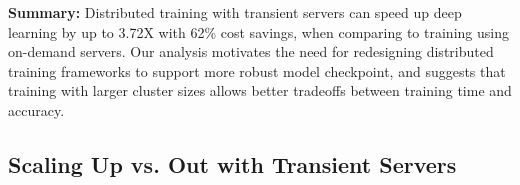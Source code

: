 \textbf{Summary:} Distributed training with transient servers can speed up
deep learning by up to 3.72X with 62\% cost savings, when comparing to training using on-demand servers. 
Our analysis motivates the need for redesigning distributed training frameworks to support more robust model checkpoint, 
and suggests that training with larger cluster sizes allows better tradeoffs between training time and accuracy. 


\subsection{Scaling Up vs. Out  with Transient Servers}
\label{subsec:scale_up}

\begin{table}[t]
\caption{\textbf{Scaling up vs. scaling out.} Under the same training cost budget constraint,  we empirically measure and compare the training performance of scaling up and out using transient resources. We calculate the average performance across all training setups that completed successfully. In the scale up case, 28 (12) out of 32 runs for \textit{P100} (\textit{V100}) were able to finish 64K steps. 
}
\end{table}
